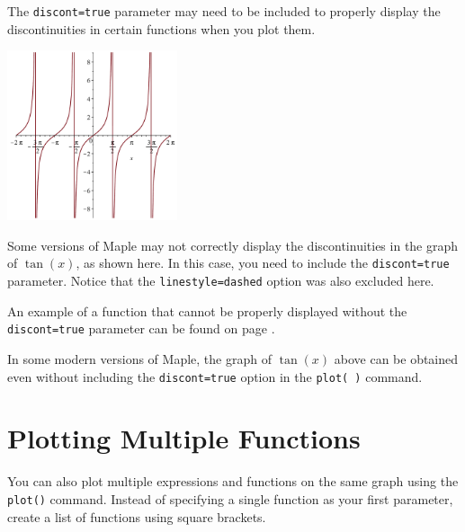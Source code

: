 The \texttt{discont=true} parameter may need to be included to properly display the discontinuities in certain functions when you plot them.

\begin{marginfigure}[-.1cm]
\includegraphics[width=5cm]{tutorials/figures/Plotting_Functionsplot2d2b-eps-converted-to.pdf}
\caption{Some versions of Maple may not correctly display the discontinuities in the graph of $\tan(x)$, as shown here. In this case, you need to include the \texttt{discont=true} parameter. Notice that the \texttt{linestyle=dashed} option was also excluded here.}
\end{marginfigure}

\begin{maplegroup}
\begin{mapleinput}
\end{mapleinput}
\mapleresult
{}
\end{maplegroup}
\begin{marginfigure}[-.8cm]
An example of a function that cannot be properly displayed without the \texttt{discont=true} parameter can be found on page \pageref{sec:limits_and_piecewise_functions}.
\end{marginfigure}
In some modern versions of Maple, the graph of $\tan(x)$ above can be obtained even without including the \texttt{discont=true} option in the \texttt{plot( )} command.

\section{Plotting Multiple Functions}
\label{sec:plotting_multiple_functions}

You can also plot multiple expressions and functions on the same graph using the \texttt{plot()} command. Instead of specifying a single function as your first parameter, create a list of functions using square brackets.

